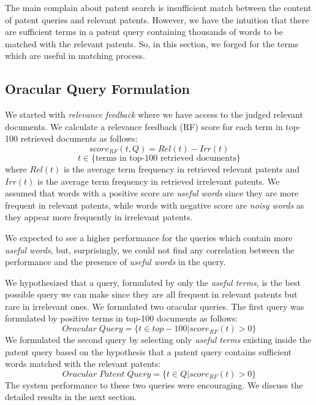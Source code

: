 The main complain about patent search is insufficient match between the content of patent queries and relevant
patents\cite{lupu2013patent}\cite{magdy2012toward}. However, we have the intuition that there are sufficient terms in a patent query containing thousands of words to be matched with the relevant patents. So, in this section, we forged for the terms which are useful in matching process. 
\subsection{Oracular Query Formulation}
We started with {\em relevance feedback} where we have access to the judged relevant documents. We calculate a relevance feedback (RF) score for each term in top-100 retrieved documents as follows:
\begin{equation}
score_{RF}(t,Q)=Rel(t)-Irr(t) 
 \label{eq:score}
\end{equation}\vspace*{-5ex}
\begin{displaymath}t\in \lbrace \mbox{terms in top-100 retrieved documents}\rbrace\end{displaymath}
where $ Rel(t) $ is the average term frequency in retrieved relevant patents and $ Irr(t) $ is the average term frequency in retrieved irrelevant patents. We assumed that words with a positive score are {\em useful words} since they are more frequent in relevant patents, while words with negative score are {\em noisy words} as they appear more frequently in irrelevant patents. 

We expected to see a higher performance for the queries which contain more {\em useful words}, but, surprisingly, we could not find any correlation between the performance and the presence of {\em useful words} in the query. 

We hypothesized that a query, formulated by only the {\em useful terms}, is the best possible query we can make since they are all frequent in relevant patents but rare in irrelevant ones. We formulated two oracular queries. The first query was formulated by positive terms in top-100 documents as follows: 
\begin{equation}
Oracular \; Query = \{t \in top-100|score_{RF}(t)>0\}   
 \label{eq:score}
\end{equation}
We formulated the second query by selecting only {\em useful terms} existing inside the patent query based on the hypothesis that a patent query contains sufficient words matched with the relevant patents:
\begin{equation}
 Oracular \; Patent \; Query = \{t\in Q|score_{RF}(t)>0\}   
 \label{eq:score}
\end{equation}
The system performance to these two queries were encouraging. We discuss the detailed results in the next section.

